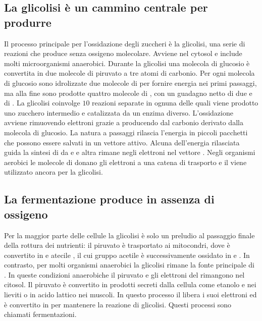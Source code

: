 \subsection{La glicolisi \`e un cammino centrale per produrre }
Il processo principale per l'ossidazione degli zuccheri \`e la glicolisi, una serie di reazioni che produce  senza ossigeno molecolare. Avviene nel cytosol e include molti 
microorganismi anaerobici. Durante la glicolisi una molecola di glucosio \`e convertita in due molecole di piruvato a tre atomi di carbonio. Per ogni molecola di glucosio sono 
idrolizzate due molecole di  per fornire energia nei primi passaggi, ma alla fine sono prodotte quattro molecole di , con un guadagno netto di due  e di 
. La glicolisi coinvolge $10$ reazioni separate in ognuna delle quali viene prodotto uno zucchero intermedio e catalizzata da un enzima diverso. L'ossidazione avviene 
rimuovendo elettroni grazie a  producendo  dal carbonio derivato dalla molecola di glucosio. La natura a passaggi rilascia l'energia in piccoli pacchetti che possono 
essere salvati in un vettore attivo. Alcuna dell'energia rilasciata guida la sintesi di  da  e  e altra rimane negli elettroni nel vettore . Negli 
organismi aerobici le molecole di  donano gli elettroni a una catena di trasporto e il  viene utilizzato ancora per la glicolisi. 
\subsection{La fermentazione produce  in assenza di ossigeno}
Per la maggior parte delle cellule la glicolisi \`e solo un preludio al passaggio finale della rottura dei nutrienti: il piruvato \`e trasportato ai mitocondri, dove \`e convertito in 
 e atecile , il cui gruppo acetile \`e successivamente ossidato in  e . In contrasto, per molti organismi anaerobici la glicolisi rimane la fonte 
principale di . In queste condizioni anaerobiche il piruvato e gli elettroni del  rimangono nel citosol. Il piruvato \`e convertito in prodotti secreti dalla cellula 
come etanolo e  nei lieviti o in acido lattico nei muscoli. In questo processo il  libera i suoi elettroni ed \`e convertito in  per mantenere la reazione di
glicolisi. Questi processi sono chiamati fermentazioni. 

